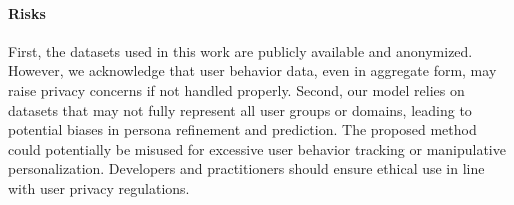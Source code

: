 \paragraph{Risks} First, the datasets used in this work are publicly available and anonymized. However, we acknowledge that user behavior data, even in aggregate form, may raise privacy concerns if not handled properly. Second, our model relies on datasets that may not fully represent all user groups or domains, leading to potential biases in persona refinement and prediction. The proposed method could potentially be misused for excessive user behavior tracking or manipulative personalization. Developers and practitioners should ensure ethical use in line with user privacy regulations.